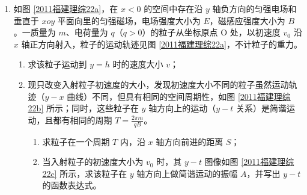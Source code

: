 \documentclass[\gkver]{gaokaozhenti}
\begin{document}
\begin{enumerate}
\item
如图 \ref{2011福建理综22a}，在 $x<0$ 的空间中存在沿 $y$ 轴负方向的匀强电场和垂直于 $xoy$ 平面向里的匀强磁场，电场强度大小为 $E$，磁感应强度大小为 $B$。一质量为 $m$、电荷量为 $q$（$q>0$）的粒子从坐标原点 O 处，以初速度 $v_{0}$ 沿 $x$ 轴正方向射入，粒子的运动轨迹见图 \ref{2011福建理综22a}，不计粒子的重力。
\begin{enumerate}
	\item
	求该粒子运动到 $y=h$ 时的速度大小 $v$；
	\item
	现只改变入射粒子初速度的大小，发现初速度大小不同的粒子虽然运动轨迹（$y-x$ 曲线）不同，但具有相同的空间周期性，如图 \ref{2011福建理综22b} 所示；同时，这些粒子在 $y$ 轴方向上的运动（$y-t$ 关系）是简谐运动，且都有相同的周期 $T=\frac{2\pi m}{qB}$。
	\begin{enumerate}
		\item
		求粒子在一个周期 $T$ 内，沿 $x$ 轴方向前进的距离 $S$；
		\item
		当入射粒子的初速度大小为 $v_{0}$ 时，其 $y-t$ 图像如图 \ref{2011福建理综22c} 所示，求该粒子在 $y$ 轴方向上做简谐运动的振幅 $A$，并写出 $y-t$ 的函数表达式。
	\end{enumerate}
\end{enumerate}


\end{enumerate}
\end{document}
